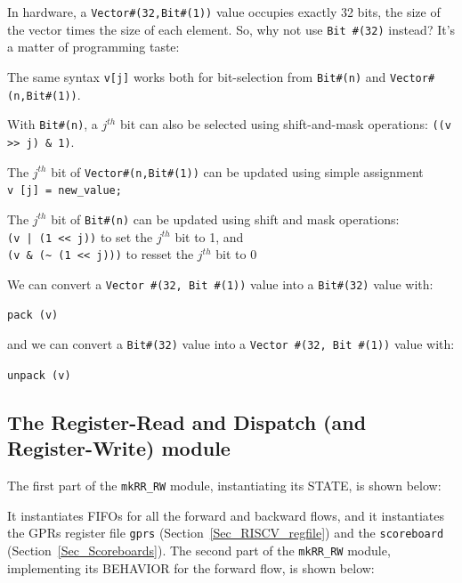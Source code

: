 In hardware, a \verb|Vector#(32,Bit#(1))| value occupies exactly 32
bits, {\ie} the size of the vector times the size of each element.
So, why not use \verb|Bit #(32)| instead?  It's a matter of
programming taste:

\begin{tightlist}

  \item The same syntax \verb|v[j]| works both for bit-selection from
        \verb|Bit#(n)| and \verb|Vector#(n,Bit#(1))|.

  \item With \verb|Bit#(n)|, a $j^{th}$ bit can also be selected using
        shift-and-mask operations: \verb|((v >> j) & 1)|.

  \item The $j^{th}$ bit of \verb|Vector#(n,Bit#(1))| can be updated
        using simple assignment \\
	\hmm \verb|v [j] = new_value;|

  \item The $j^{th}$ bit of \verb|Bit#(n)| can be updated using shift
        and mask operations: \\
	\hmm \verb'(v | (1 << j))' to set the $j^{th}$ bit to 1, and \\
	\hmm \verb|(v & (~ (1 << j)))| to resset the $j^{th}$ bit to 0

\end{tightlist}

We can convert a \verb|Vector #(32, Bit #(1))| value into a \verb|Bit#(32)| value with:

\hmm \verb|pack (v)|

and we can convert a \verb|Bit#(32)| value into a \verb|Vector #(32, Bit #(1))| value with:

\hmm \verb|unpack (v)|


\subsection{The Register-Read and Dispatch (and Register-Write) module}

\label{Sec_mkRR_RW}

The first part of the \verb|mkRR_RW| module, instantiating its STATE, is shown below:



It instantiates FIFOs for all the forward and backward flows, and it
instantiates the GPRs register file \verb|gprs|
(Section~\ref{Sec_RISCV_regfile}) and the \verb|scoreboard|
(Section~\ref{Sec_Scoreboards}).  The second part of the
\verb|mkRR_RW| module, implementing its BEHAVIOR for the forward flow,
is shown below:

